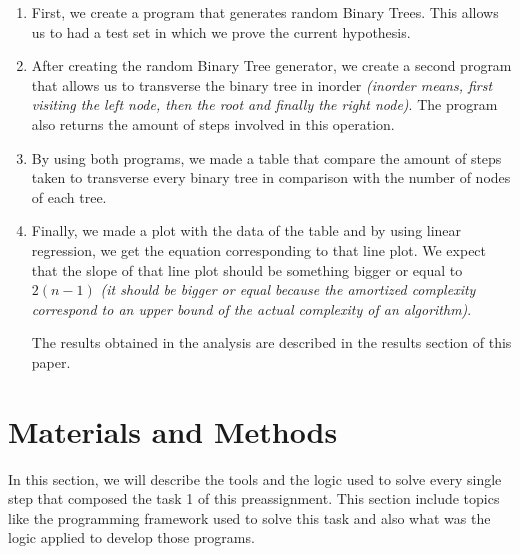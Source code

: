 \documentclass[12p]{article}
\begin{document}
\begin{enumerate}

  \item First, we create a program that generates random Binary Trees. This allows us to had a test set in which we prove the current hypothesis.
  \item After creating the random Binary Tree generator, we create a second program that allows us to transverse the binary tree in inorder \textit{(inorder means, first visiting the left node, then the root and finally the right node)}. The program also returns the amount of steps involved in this operation.
  \item By using both programs, we made a table that compare the amount of steps taken to transverse every binary tree in comparison with the number of nodes of each tree.
  \item Finally, we made a plot with the data of the table and by using linear regression, we get the equation corresponding to that line plot. We expect that the slope of that line plot should be something bigger or equal to $2(n-1)$ \textit{(it should be bigger or equal because the amortized complexity correspond to an upper bound of the actual complexity of an algorithm)}.

\bigskip

The results obtained in the analysis are described in the results section of this paper.

\end{enumerate}



  \section{Materials and Methods}
In this section, we will describe the tools and the logic used to solve every single step that composed the task 1 of this preassignment. This section include topics like the programming framework used to solve this task and also what was the logic applied to develop those programs.


\end{document}
